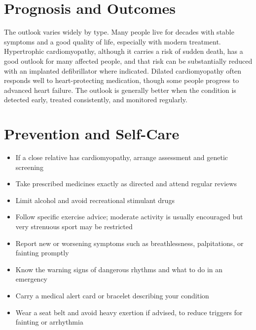 \section*{Prognosis and Outcomes}
The outlook varies widely by type. Many people live for decades with stable symptoms and a good quality of life, especially with modern treatment. Hypertrophic cardiomyopathy, although it carries a risk of sudden death, has a good outlook for many affected people, and that risk can be substantially reduced with an implanted defibrillator where indicated. Dilated cardiomyopathy often responds well to heart-protecting medication, though some people progress to advanced heart failure. The outlook is generally better when the condition is detected early, treated consistently, and monitored regularly.

\section*{Prevention and Self-Care}
\begin{itemize}
    \item If a close relative has cardiomyopathy, arrange assessment and genetic screening
    \item Take prescribed medicines exactly as directed and attend regular reviews
    \item Limit alcohol and avoid recreational stimulant drugs
    \item Follow specific exercise advice; moderate activity is usually encouraged but very strenuous sport may be restricted
    \item Report new or worsening symptoms such as breathlessness, palpitations, or fainting promptly
    \item Know the warning signs of dangerous rhythms and what to do in an emergency
    \item Carry a medical alert card or bracelet describing your condition
    \item Wear a seat belt and avoid heavy exertion if advised, to reduce triggers for fainting or arrhythmia
\end{itemize}

